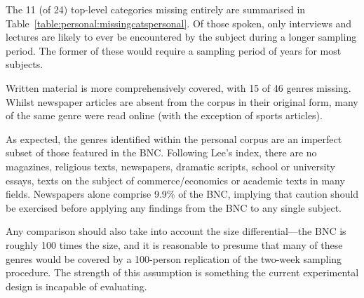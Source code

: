 The 11 (of 24) top-level categories missing entirely are summarised in Table~\ref{table:personal:missingcatspersonal}.  Of those spoken, only interviews and lectures are likely to ever be encountered by the subject during a longer sampling period.  The former of these would require a sampling period of years for most subjects.

Written material is more comprehensively covered, with 15 of 46 genres missing.  Whilst newspaper articles are absent from the corpus in their original form, many of the same genre were read online (with the exception of sports articles).  

As expected, the genres identified within the personal corpus are an imperfect subset of those featured in the BNC\@.  Following Lee's index, there are no magazines, religious texts, newspapers, dramatic scripts, school or university essays, texts on the subject of commerce/economics or academic texts in many fields.  Newspapers alone comprise 9.9\% of the BNC, implying that caution should be exercised before applying any findings from the BNC to any single subject. %

Any comparison should also take into account the size differential---the BNC is roughly 100 times the size, and it is reasonable to presume that many of these genres would be covered by a 100-person replication of the two-week sampling procedure.  The strength of this assumption is something the current experimental design is incapable of evaluating.













